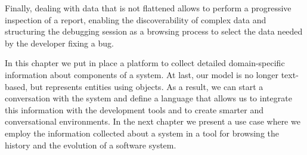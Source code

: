 Finally, dealing with data that is not flattened allows to perform a progressive inspection of a report, enabling the discoverability of complex data and structuring the debugging session as a browsing process to select the data needed by the developer fixing a bug.

In this chapter we put in place a platform to collect detailed domain-specific information about components of a system.
At last, our model is no longer text-based, but represents entities using objects.
As a result, we can start a conversation with the system and define a language that allows us to integrate this information with the development tools and to create smarter and conversational environments.
In the next chapter we present a use case where we employ the information collected about a system in a tool for browsing the history and the evolution of a software system.
